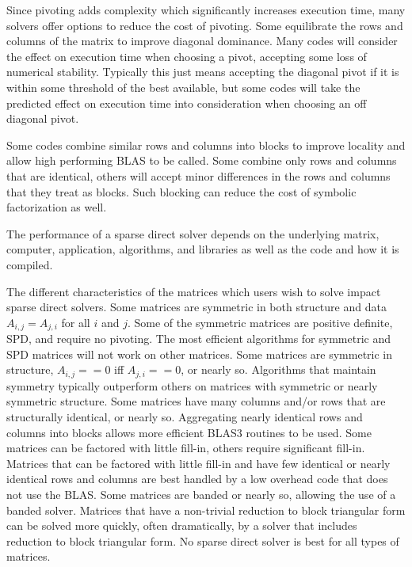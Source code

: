 \documentclass[acmtocl]{acmtrans2m}
\begin{document}
Since pivoting adds complexity which significantly increases execution
time, many solvers offer options to reduce the cost of pivoting\cite{LiDemmel509092,sg:04-fgcs}.  Some
equilibrate the rows and columns of the matrix to improve diagonal
dominance.  Many codes will consider the effect on execution time when
choosing a pivot, accepting some loss of numerical stability\cite{Malard126136}.
Typically this just means accepting the diagonal pivot if it is within
some threshold of the best available, but some codes will take the
predicted effect on execution time into consideration when choosing an off
diagonal pivot\cite{Davis992205}.

Some codes combine similar rows and columns into blocks to improve
locality and allow high performing BLAS to be called.  Some combine
only rows and columns that are identical, others will accept minor
differences in the rows and columns that they treat as blocks.  Such
blocking can reduce the cost of symbolic factorization as well\cite{amestoy01analysis}.

The performance of a sparse direct solver depends on the underlying
matrix, computer, application, algorithms, and libraries as well as
the code and how it is compiled.  

The different characteristics of the matrices which users wish to
solve impact sparse direct solvers.  Some matrices are symmetric in both
structure and data $A_{i,j} = A_{j,i}$ for all $i$ and $j$.  Some of
the symmetric matrices are positive definite, SPD, and require no
pivoting.  The most efficient algorithms for symmetric and SPD
matrices will not work on other matrices.  Some matrices are symmetric in
structure, $A_{i,j} == 0$ iff $A_{j,i} == 0$, or nearly so.
Algorithms that maintain symmetry typically outperform others on
matrices with symmetric or nearly symmetric structure.  Some matrices have many
columns and/or rows that are structurally identical, or nearly so.
Aggregating nearly identical rows and columns into blocks allows more
efficient BLAS3 routines to be used.  Some matrices can be factored with little
fill-in, others require significant fill-in.  Matrices that can be
factored with little fill-in and have few identical or nearly identical
rows and columns are best handled by a low overhead code that does not
use the BLAS.  Some matrices are banded or nearly so, allowing the use
of a banded solver.  Matrices that have a non-trivial reduction to
block triangular form can be solved more quickly, often dramatically,
by a solver that includes reduction to block triangular form.  No sparse direct solver is best for all types of matrices.  
\end{document}
